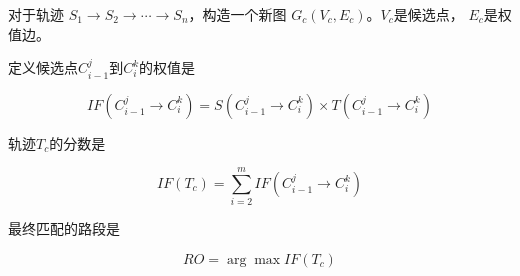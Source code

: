 对于轨迹 $ S_{1} \longrightarrow S_{2} \longrightarrow \cdots \longrightarrow S_{n} $，构造一个新图 $ G_{c}\left(V_{c}, E_{c}\right) $。$V_c$是候选点， $E_c$是权值边。

定义候选点$C_{i-1}^{j}$到$C_{i}^{k}$的权值是

$$ I F\left(C_{i-1}^{j} \rightarrow C_{i}^{k}\right)=S\left(C_{i-1}^{j} \rightarrow C_{i}^{k}\right) \times T\left(C_{i-1}^{j} \rightarrow C_{i}^{k}\right) $$

轨迹$T_c$的分数是

$$ I F\left(T_{c}\right)=\sum_{i=2}^{m} I F\left(C_{i-1}^{j} \rightarrow C_{i}^{k}\right) $$

最终匹配的路段是

$$RO = \arg \max IF(T_c)$$